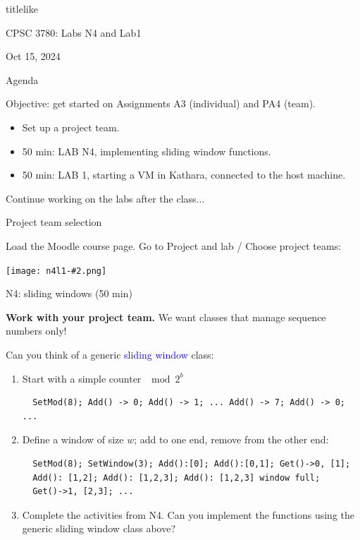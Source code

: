 \documentclass[aspectratio=1610]{beamer}
\newcommand{\Emph}[1]{
  \textcolor{blue}{#1}
  }
\newcommand{\fig}[2][1]{
  \texttt{[image: n4l1-\#2.png]}
  }
\begin{document}
\begin{frame}[plain]
\begin{beamercolorbox}[rounded=true,shadow=true]{titlelike}
{\LARGE
\begin{center}
  CPSC 3780: Labs N4 and Lab1
\end{center}
}
\end{beamercolorbox}
\vfill
\parbox{.45\textwidth}{Oct 15, 2024
}
\end{frame}



\begin{frame}[plain,t]{Agenda}

  Objective: get started on Assignments A3 (individual) and PA4 (team).
  \begin{itemize}
  \item Set up a project team.
  \item 50 min: LAB N4, implementing sliding window functions.
  \item 50 min: LAB 1, starting a VM in Kathara, connected to the host machine.
  \end{itemize}

  Continue working on the labs after the class...
  
\end{frame}


\begin{frame}[plain,t]{Project team selection}

  Load the Moodle course page. Go to Project and lab / Choose project teams:

  \vfill
  \fig[0.3]{000}  
  \vfill
\end{frame}


\begin{frame}{N4: sliding windows (50 min)}

  \textbf{Work with your project team.} We want classes that manage sequence numbers only!

  Can you think of a generic \Emph{sliding window} class:
  \begin{enumerate}
  \item Start with a simple counter $\mod 2^b$

\begin{verbatim}
  SetMod(8); Add() -> 0; Add() -> 1; ... Add() -> 7; Add() -> 0; ...
\end{verbatim}

\item Define a window of size $w$; add to one end, remove from the other end:

\begin{verbatim}
  SetMod(8); SetWindow(3); Add():[0]; Add():[0,1]; Get()->0, [1];
  Add(): [1,2]; Add(): [1,2,3]; Add(): [1,2,3] window full;
  Get()->1, [2,3]; ... 
\end{verbatim}

\item Complete the activities from N4. Can you implement the functions using the generic sliding window class above?
  \end{enumerate}
\end{frame}
\end{document}
